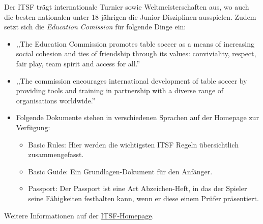 Der ITSF trägt internationale Turnier sowie Weltmeisterschaften aus, wo auch die besten nationalen unter 18-jährigen die Junior-Disziplinen ausspielen.
Zudem setzt sich die \textit{Education Comission} für folgende Dinge ein:
\begin{itemize}
\item ,,The Education Commission promotes table soccer as a means of increasing social cohesion and ties of friendship through its values: conviviality, respect, fair play, team spirit and access for all.''
\item ,,The commission encourages international development of table soccer by providing tools and training in partnership with a diverse range of organisations worldwide.''
\item Folgende Dokumente stehen in verschiedenen Sprachen auf der Homepage zur Verfügung:
\begin{itemize}
\item Basic Rules: Hier werden die wichtigsten ITSF Regeln übersichtlich zusammengefasst.
\item Basic Guide: Ein Grundlagen-Dokument für den Anfänger. 
\item Passport: Der Passport ist eine Art Abzeichen-Heft, in das der Spieler seine Fähigkeiten festhalten kann, wenn er diese einem Prüfer präsentiert.
\end{itemize}
\end{itemize}
Weitere Informationen auf der \href{http://www.table-soccer.org/}{ITSF-Homepage}.


